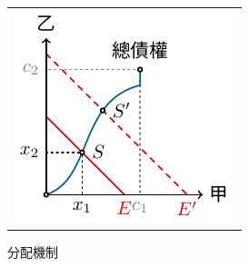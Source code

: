 \begin{center}
	\hfill
	\begin{tabular}{l}
		\includegraphics{divide/divide-generic.pdf}
	\end{tabular}
	\hfill\textsf{分配機制}
\end{center}
